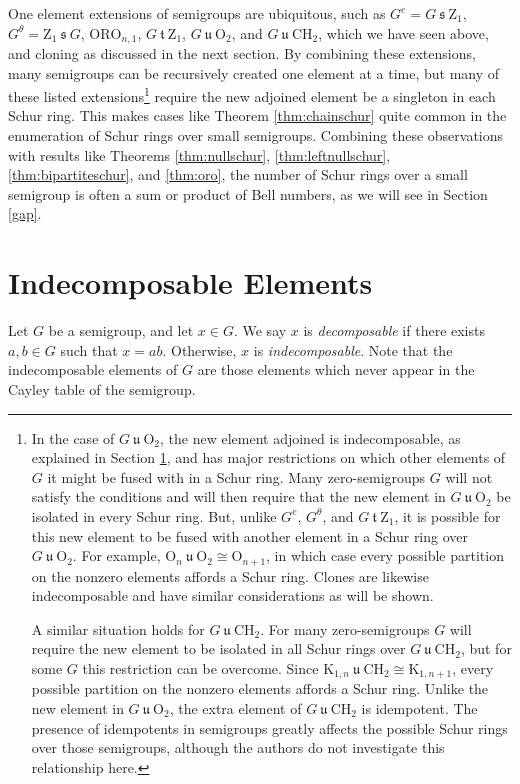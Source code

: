 \documentclass{article}
\theoremstyle{plain}
\theoremstyle{definition}
\newcommand{\thmref}[1]{Theorem \ref{#1}}
\renewcommand{\O}{\mathrm{O}}
\newcommand{\K}{\mathrm{K}}
\newcommand{\ORO}{\mathrm{ORO}}
\newcommand{\CH}{\mathrm{CH}}
\newcommand{\z}{\mathrm{Z}}
\newcommand{\s}{\ \mathfrak{s}\ }
\renewcommand{\t}{\ \mathfrak{t}\ }
\renewcommand{\u}{\ \mathfrak{u}\ }
\begin{document}
One element extensions of semigroups are ubiquitous, such as $G^e = G\s \z_1$, $G^\theta = \z_1\s G$, $\ORO_{n,1}$, $G\t \z_1$, $G\u \O_2$, and $G\u\CH_2$, which we have seen above, and cloning as discussed in the next section. By combining these extensions, many semigroups can be recursively created one element at a time, but many of these listed extensions\footnote{In the case of $G\u \O_2$, the new element adjoined is indecomposable, as explained in Section \ref{indecomposable}, and has major restrictions on which other elements of $G$ it might be fused with in a Schur ring. Many zero-semigroups $G$ will not satisfy the conditions and will then require that the new element in $G\u \O_2$ be isolated in every Schur ring. But, unlike $G^e$, $G^\theta$, and $G\t \z_1$, it is possible for this new element to be fused with another element in a Schur ring over $G\u \O_2$. For example, $\O_n\u \O_2 \cong \O_{n+1}$, in which case every possible partition on the nonzero elements affords a Schur ring. Clones are likewise indecomposable and have similar considerations as will be shown.

A similar situation holds for $G\u \CH_2$. For many zero-semigroups $G$ will require the new element to be isolated in all Schur rings over $G\u\CH_2$, but for some $G$ this restriction can be overcome. Since $\K_{1,n}\u \CH_2 \cong \K_{1,n+1}$, every possible partition on the nonzero elements affords a Schur ring. Unlike the new element in $G\u \O_2$, the extra element of $G\u \CH_2$ is idempotent. The presence of idempotents in semigroups greatly affects the possible Schur rings over those semigroups, although the authors do not investigate this relationship here.} require the new adjoined element be a singleton in each Schur ring. This makes cases like \thmref{thm:chainschur} quite common in the enumeration of Schur rings over small semigroups. Combining these observations with results like Theorems \ref{thm:nullschur}, \ref{thm:leftnullschur}, \ref{thm:bipartiteschur}, and \ref{thm:oro}, the number of Schur rings over a small semigroup is often a sum or product of Bell numbers, as we will see in Section \ref{gap}.

\section{Indecomposable Elements}\label{indecomposable}
Let $G$ be a semigroup, and let $x\in G$. We say $x$ is \emph{decomposable} if there exists $a,b\in G$ such that $x=ab$. Otherwise, $x$ is \emph{indecomposable}. Note that the indecomposable elements of $G$ are those elements which never appear in the Cayley table of the semigroup.
\end{document}
